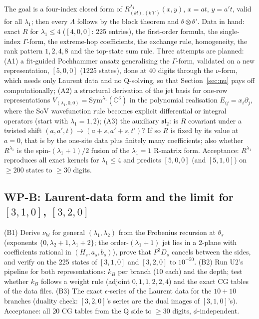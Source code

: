 \documentclass[11pt]{article}
\begin{document}
The goal is a four-index closed form of $R^{\lambda_1}_{(kl),(k'l')}(x,y)$, $x=at$, $y=a't$, valid for all $\lambda_1$; then every $\Lambda$ follows by the block theorem and $\theta\otimes\theta'$. Data in hand: exact $R$ for $\lambda_1\le4$ ($[4,0,0]$: 225 entries), the first-order formula, the single-index $\Gamma$-form, the extreme-hop coefficients, the exchange rule, homogeneity, the rank pattern $1,2,4,8$ and the top-state sum rule.
Three attempts are planned: (A1) a fit-guided Pochhammer ansatz generalising the $\Gamma$-form, validated on a new representation, $[5,0,0]$ (1225 states), done at 40 digits through the $\nu$-form, which needs only Laurent data and no Q-solving, so that Section~\ref{sec:nu} pays off computationally; (A2) a structural derivation of the jet basis for one-row representations $V_{(\lambda_1,0,0)}=\mathrm{Sym}^{\lambda_1}(\mathbb{C}^3)$ in the polynomial realisation $E_{ij}=x_i\partial_j$, where the SoV wavefunction rule becomes explicit differential or integral operators (start with $\lambda_1=1,2$); (A3) the auxiliary $\mathfrak{sl}_2$: is $R$ covariant under a twisted shift $(a,a',t)\to(a+s,a'+s,t')$? If so $R$ is fixed by its value at $a=0$, that is by the one-site data plus finitely many coefficients; also whether $R^{\lambda_1}$ is the spin-$(\lambda_1+1)/2$ fusion of the $\lambda_1=1$ R-matrix form.
Acceptance: $R^{\lambda_1}$ reproduces all exact kernels for $\lambda_1\le4$ and predicts $[5,0,0]$ (and $[5,1,0]$) on $\ge200$ states to $\ge30$ digits.

\subsection{WP-B: Laurent-data form and the limit for \texorpdfstring{$[3,1,0]$}{[3,1,0]}, \texorpdfstring{$[3,2,0]$}{[3,2,0]}}\label{sec:WPB}

(B1) Derive $\nu_{kl}$ for general $(\lambda_1,\lambda_2)$ from the Frobenius recursion at $\theta_s$ (exponents $\{0,\lambda_2+1,\lambda_1+2\}$; the order-$(\lambda_1+1)$ jet lies in a 2-plane with coefficients rational in $(H_s,a_s,b_s)$), prove that $P^3D_s$ cancels between the sides, and verify on the 225 states of $[3,1,0]$ and $[3,2,0]$ to $10^{-50}$. (B2) Run U2's pipeline for both representations: $k_B$ per branch (10 each) and the depth; test whether $k_B$ follows a weight rule (adjoint $0,1,1,2,2,4$) and the exact CG tables of the data files. (B3) The exact $\epsilon$-series of the Laurent data for the $10+10$ branches (duality check: $[3,2,0]$'s series are the dual images of $[3,1,0]$'s).
Acceptance: all 20 CG tables from the Q side to $\ge30$ digits, $\phi$-independent.
\end{document}
